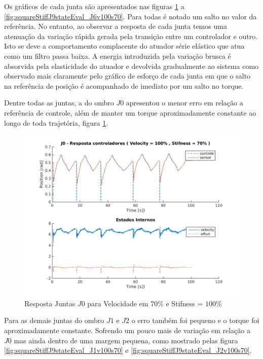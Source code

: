 Os gráficos de cada junta são apresentados nas figuras \ref{fig:squareStiffJ9stateEval_J0v100s70} a \ref{fig:squareStiffJ9stateEval_J6v100s70}. Para todas é notado um salto no valor da referência. No entanto, ao observar a resposta de cada junta temos uma atenuação da variação rápida gerada pela transição entre um controlador e outro. Isto se deve a comportamento complacente do atuador série elástico que atua como um filtro passa baixa. A energia introduzida pela variação brusca é absorvida pela elasticidade do atuador e devolvida gradualmente ao sistema como observado mais claramente pelo gráfico de esforço de cada junta em que o salto na referência de posição é acompanhado de imediato por um salto no torque. 

Dentre todas as juntas, a do ombro $J0$ apresentou o menor erro em relação a referência de controle, além de manter um torque aproximadamente constante ao longo de toda trajetória, figura \ref{fig:squareStiffJ9stateEval_J0v100s70}.

\vspace{1cm}

\begin{figure}[H]
    \centering
    \includegraphics[width=0.6\linewidth,trim={2cm 1cm 2cm 2cm}]{tex/figs/squareStiffJ9stateEval_J0v100s70.png}
    \caption{Resposta Juntas $J0$ para Velocidade em $70\%$ e Stifness = $100\%$ }
    \label{fig:squareStiffJ9stateEval_J0v100s70}
\end{figure}

Para as demais juntas do ombro $J1$ e $J2$ o erro também foi pequeno e o torque foi aproximadamente constante. Sofrendo um pouco mais de variação em relação a $J0$ mas ainda dentro de uma margem pequena, como mostrado pelas figura \ref{fig:squareStiffJ9stateEval_J1v100s70} e \ref{fig:squareStiffJ9stateEval_J2v100s70}.

